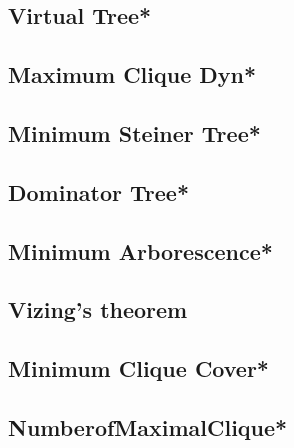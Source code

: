 \subsection{Virtual Tree*} %

\subsection{Maximum Clique Dyn*} %
 
\subsection{Minimum Steiner Tree*} %

\subsection{Dominator Tree*} %

\subsection{Minimum Arborescence*} %

\subsection{Vizing's theorem}

\subsection{Minimum Clique Cover*} %

\subsection{NumberofMaximalClique*} %



